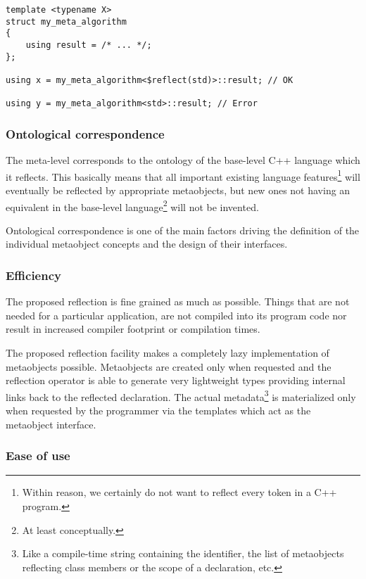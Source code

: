 \begin{verbatim}
template <typename X>
struct my_meta_algorithm
{
	using result = /* ... */;
};

using x = my_meta_algorithm<$reflect(std)>::result; // OK

using y = my_meta_algorithm<std>::result; // Error

\end{verbatim}

\subsubsection{Ontological correspondence}
\label{design-onto-corr}

The meta-level 
corresponds to the ontology of the base-level C++ language
which it reflects. This basically means that all important existing language
features\footnote{Within reason, we certainly do not want to reflect every token
in a C++ program.} will eventually be reflected by appropriate metaobjects,
but new ones not having an equivalent in the base-level language\footnote{At least
conceptually.} will not be invented.

Ontological correspondence is one of the main factors driving the definition of the
individual metaobject concepts and the design of their interfaces.


\subsubsection{Efficiency}
\label{design-efficiency}

The proposed reflection is fine grained as much as possible.
Things that are not needed for a particular application,
are not compiled into its program code nor result in
increased compiler footprint or compilation times.

The proposed reflection facility makes a completely lazy implementation of
metaobjects possible. Metaobjects are created only when requested and
the reflection operator is able to generate very
lightweight types providing internal links back to the reflected declaration.
The actual
metadata\footnote{Like a compile-time string containing the identifier,
the list of metaobjects reflecting class members or the scope of a declaration,
etc.} is materialized only when requested by the programmer via the
templates which act as the metaobject interface.

\subsubsection{Ease of use}
\label{design-ease-of-use}

